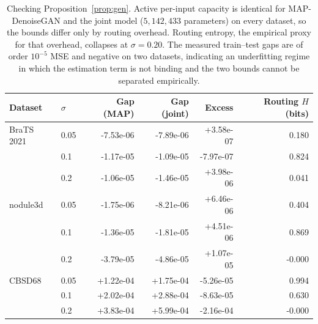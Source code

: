 \begin{table}[!t]
\centering
\caption{Checking Proposition~\ref{prop:gen}. Active per-input capacity is identical for MAP-DenoiseGAN and the joint model ($5{,}142{,}433$ parameters) on every dataset, so the bounds differ only by routing overhead. Routing entropy, the empirical proxy for that overhead, collapses at $\sigma=0.20$. The measured train--test gaps are of order $10^{-5}$ MSE and negative on two datasets, indicating an underfitting regime in which the estimation term is not binding and the two bounds cannot be separated empirically.}
\label{tab:gen}
\begin{tabular}{llrrrr}
\toprule
Dataset & $\sigma$ & Gap (MAP) & Gap (joint) & Excess & Routing $H$ (bits) \\
\midrule
BraTS 2021 & 0.05 & -7.53e-06 & -7.89e-06 & +3.58e-07 & 0.180 \\
 & 0.1 & -1.17e-05 & -1.09e-05 & -7.97e-07 & 0.824 \\
 & 0.2 & -1.06e-05 & -1.46e-05 & +3.98e-06 & 0.041 \\
nodule3d & 0.05 & -1.75e-06 & -8.21e-06 & +6.46e-06 & 0.404 \\
 & 0.1 & -1.36e-05 & -1.81e-05 & +4.51e-06 & 0.869 \\
 & 0.2 & -3.79e-05 & -4.86e-05 & +1.07e-05 & -0.000 \\
CBSD68 & 0.05 & +1.22e-04 & +1.75e-04 & -5.26e-05 & 0.994 \\
 & 0.1 & +2.02e-04 & +2.88e-04 & -8.63e-05 & 0.630 \\
 & 0.2 & +3.83e-04 & +5.99e-04 & -2.16e-04 & -0.000 \\
\bottomrule
\end{tabular}
\end{table}
